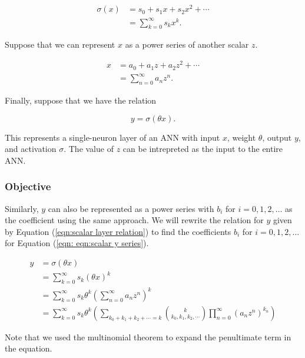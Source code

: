 \begin{align}
    \sigma(x)
    &= s_0 + s_1 x + s_2 x^2 + \cdots \nonumber \\
	&= \sum_{k=0}^{\infty} s_{k} x^{k}.
	\label{eqn:scalar layer activation}
\end{align}

Suppose that we can represent $x$ as a power series of another scalar $z$.

\begin{align}
    x
    &= a_0 + a_1 z + a_2 z^2 + \cdots \nonumber \\
	&= \sum_{n=0}^{\infty} a_{n} z^{n}.
	\label{eqn:scalar x series}
\end{align}

Finally, suppose that we have the relation

\begin{equation}
	y = \sigma(\theta x).
	\label{eqn:scalar layer relation}
\end{equation}

This represents a single-neuron layer of an ANN with input $x$, weight $\theta$, output $y$, and activation $\sigma$. The value of $z$ can be intrepreted as the input to the entire ANN.

\subsubsection{Objective}
Similarly, $y$ can also be represented as a power series with $b_i$ for $i = 0, 1, 2, \ldots$ as the coefficient using the same approach. We will rewrite the relation for $y$ given by Equation (\ref{eqn:scalar layer relation}) to find the coefficients $b_i$ for $i = 0, 1, 2, \ldots$ for Equation (\ref{eqn: eqn:scalar y series}).

\begin{align}
    y
    &= \sigma(\theta x) \nonumber \\
    &= \sum_{k=0}^{\infty} s_k (\theta x)^k \nonumber \\
    &= \sum_{k=0}^{\infty} s_k \theta^k \left(\sum_{n=0}^{\infty} a_{n} z^{n}\right)^{k} \nonumber \\
	&= \sum_{k=0}^{\infty} s_k \theta^k \left(\sum_{k_0 + k_1 + k_2 + \cdots = k} \binom{k}{k_0, k_1, k_2, \cdots} \prod_{n=0}^{\infty} (a_n z^{n})^{k_n} \right)
	\label{eqn:scalar y expansion}
\end{align}

Note that we used the multinomial theorem to expand the penultimate term in the equation.

